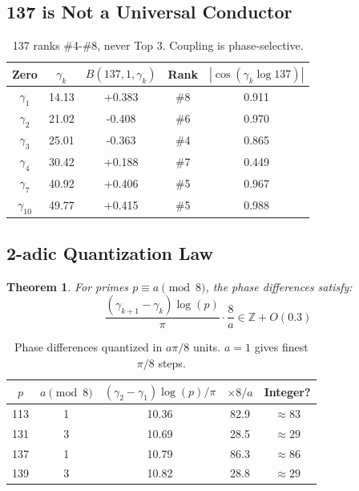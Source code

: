 \documentclass{article}
\newtheorem{theorem}{Theorem}
\begin{document}
\subsection{137 is Not a Universal Conductor}
\begin{table}[h]
\centering
\begin{tabular}{@{}ccccc@{}}
\toprule
Zero & $\gamma_k$ & $B(137,1,\gamma_k)$ & Rank & $|\cos(\gamma_k\log 137)|$ \\
\midrule
$\gamma_1$ & 14.13 & +0.383 & \#8 & 0.911 \\
$\gamma_2$ & 21.02 & -0.408 & \#6 & 0.970 \\
$\gamma_3$ & 25.01 & -0.363 & \#4 & 0.865 \\
$\gamma_4$ & 30.42 & +0.188 & \#7 & 0.449 \\
$\gamma_7$ & 40.92 & +0.406 & \#5 & 0.967 \\
$\gamma_{10}$ & 49.77 & +0.415 & \#5 & 0.988 \\
\bottomrule
\end{tabular}
\caption{137 ranks \#4-\#8, never Top 3. Coupling is phase-selective.}
\end{table}

\subsection{2-adic Quantization Law}
\begin{theorem}
For primes $p \equiv a \pmod{8}$, the phase differences satisfy:
\begin{equation}
\frac{(\gamma_{k+1} - \gamma_k)\log(p)}{\pi} \cdot \frac{8}{a} \in \mathbb{Z} + O(0.3)
\end{equation}
\end{theorem}

\begin{table}[h]
\centering
\begin{tabular}{@{}ccccc@{}}
\toprule
$p$ & $a \pmod{8}$ & $(\gamma_2-\gamma_1)\log(p)/\pi$ & $\times 8/a$ & Integer? \\
\midrule
113 & 1 & 10.36 & 82.9 & $\approx 83$ \\
131 & 3 & 10.69 & 28.5 & $\approx 29$ \\
137 & 1 & 10.79 & 86.3 & $\approx 86$ \\
139 & 3 & 10.82 & 28.8 & $\approx 29$ \\
\bottomrule
\end{tabular}
\caption{Phase differences quantized in $a\pi/8$ units. $a=1$ gives finest $\pi/8$ steps.}
\end{table}
\end{document}
